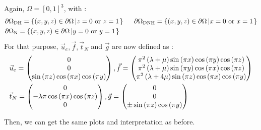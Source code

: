 \documentclass[a4paper,12pt,twoside]{report}
\begin{document}
Again, $\Omega = [0,1]^3$, with : 
\begin{equation*}
	\begin{aligned}
		& \partial \Omega_{\text{DH}} = \left\{  (x,y,z) \in \partial\Omega \left| z = 0 \text{ or } z = 1 \right.  \right\} \hspace{0.5cm} 
		\partial \Omega_{\text{DNH}} = \left\{  (x,y,z) \in \partial\Omega \left| x = 0 \text{ or } x = 1 \right.  \right\} \\
		& \partial \Omega_{\text{N}} = \left\{  (x,y,z) \in \partial\Omega \left| y = 0 \text{ or } y = 1 \right.  \right\}
	\end{aligned}
\end{equation*}
For that purpose, $\vec u_e, \vec f, \vec t_N$ and $\vec g$ are now defined as : 
\begin{equation*}
\begin{aligned}
	& \vec u_e =
	\begin{pmatrix}
		0 \\  
		0 \\ 
		\sin{\left(\pi z \right)} \cos{\left(\pi x \right)} \cos{\left(\pi y \right)}
	\end{pmatrix}, \hfill \vec f =  \begin{pmatrix}
	\pi^{2} \left(\lambda + \mu\right) \sin{\left(\pi x \right)} \cos{\left(\pi y \right)} \cos{\left(\pi z \right)} \\
	\pi^{2} \left(\lambda + \mu\right) \sin{\left(\pi y \right)} \cos{\left(\pi x \right)} \cos{\left(\pi z \right)} \\
	\pi^{2} \left(\lambda + 4 \mu\right) \sin{\left(\pi z \right)} \cos{\left(\pi x \right)} \cos{\left(\pi y \right)}
	\end{pmatrix} \\
	& \vec t_N = \begin{pmatrix}
	0 \\  
	- \lambda \pi \cos{\left(\pi x \right)} \cos{\left(\pi z \right)} \\  
	0
	\end{pmatrix}, \hfill \vec g = \begin{pmatrix}
	0 \\  
	0 \\ 
	\pm \sin{\left(\pi z \right)} \cos{\left(\pi y \right)}
	\end{pmatrix}
\end{aligned}
\end{equation*}	

Then, we can get the same plots and interpretation as before. 
\end{document}
